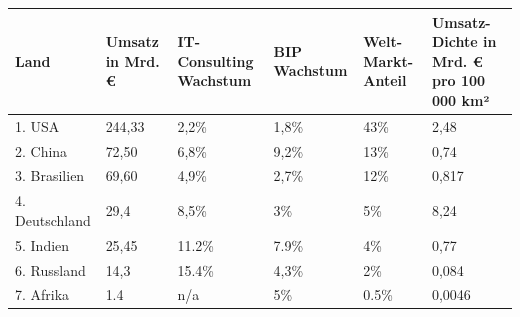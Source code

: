 \begin{itemize}
\begin{tabular}{|p{2.6cm}|p{1.5cm}|p{2cm}|p{1.5cm}|p{1.5cm}|p{1.7cm}|}
 \hline
  \textbf{Land} & \textbf{Umsatz in Mrd. €} & \textbf{IT-Consulting Wachstum} & \textbf{BIP Wachstum} & \textbf{Welt-Markt-Anteil} & \textbf{Umsatz-Dichte in Mrd. € pro 100 000 km²} \\
  \hline
    
    1. USA  & 244,33  &2,2\%  & 1,8\% & 43\% & 2,48  \\
    2. China & 72,50 & 6,8\%  & 9,2\% & 13\% & 0,74 \\
    3. Brasilien & 69,60 & 4,9\%  & 2,7\% & 12\% & 0,817 \\
    4. Deutschland & 29,4 & 8,5\%  & 3\% & 5\% & 8,24 \\
    5. Indien & 25,45  & 11.2\%  & 7.9\% & 4\% & 0,77  \\
    6. Russland & 14,3  & 15.4\%  & 4,3\% & 2\% & 0,084  \\
    7. Afrika & 1.4  & n/a  & 5\% & 0.5\% & 0,0046 \\
 \hline
\end{tabular}


\end{itemize}



